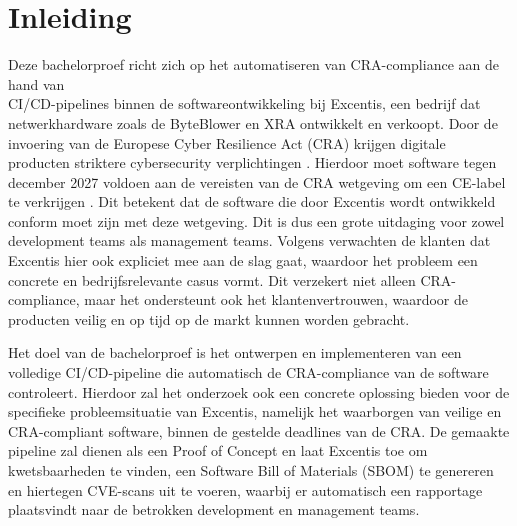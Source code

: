 


% 

\section{Inleiding}%
\label{sec:inleiding}

Deze bachelorproef richt zich op het automatiseren van CRA-compliance aan de hand van\\CI/CD-pipelines binnen de softwareontwikkeling bij Excentis, een bedrijf dat netwerkhardware zoals de ByteBlower en XRA ontwikkelt en verkoopt. Door de invoering van de Europese Cyber Resilience Act (CRA) krijgen digitale producten striktere cybersecurity verplichtingen \parencite{EU_CRA}. Hierdoor moet software tegen december 2027 voldoen aan de vereisten van de CRA wetgeving om een CE-label te verkrijgen \parencite{EuropeanCommission2024CRAnews}. Dit betekent dat de software die door Excentis wordt ontwikkeld conform moet zijn met deze wetgeving. Dit is dus een grote uitdaging voor zowel development teams als management teams. Volgens \textcite{Robyn2025} verwachten de klanten dat Excentis hier ook expliciet mee aan de slag gaat, waardoor het probleem een concrete en bedrijfsrelevante casus vormt. Dit verzekert niet alleen CRA-compliance, maar het ondersteunt ook het klantenvertrouwen, waardoor de producten veilig en op tijd op de markt kunnen worden gebracht.

Het doel van de bachelorproef is het ontwerpen en implementeren van een volledige CI/CD-pipeline die automatisch de CRA-compliance van de software controleert. Hierdoor zal het onderzoek ook een concrete oplossing bieden voor de specifieke probleemsituatie van Excentis, namelijk het waarborgen van veilige en CRA-compliant software, binnen de gestelde deadlines van de CRA. De gemaakte pipeline zal dienen als een Proof of Concept en laat Excentis toe om kwetsbaarheden te vinden, een Software Bill of Materials (SBOM) te genereren en hiertegen CVE-scans uit te voeren, waarbij er automatisch een rapportage plaatsvindt naar de betrokken development en management teams. 

